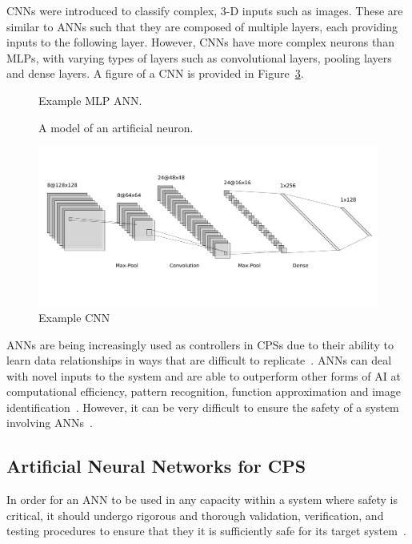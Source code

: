 \acp{CNN} were introduced to classify complex, 3-D inputs such as images.
These are similar to \acp{ANN} such that they are composed of multiple layers, each providing inputs to the following layer. 
However, \acp{CNN} have more complex neurons than \acp{MLP}, with varying types of layers such as convolutional layers, pooling layers and dense layers.
A figure of a \ac{CNN} is provided in Figure~\ref{fig:cnn}.


\begin{figure}
	\centering
	\scalebox{0.8}{}
	\caption{Example \ac{MLP} \ac{ANN}.	\label{fig:mlp-ann}}
\end{figure}
\begin{figure}
	\centering
	\scalebox{0.8}{}
	\caption{A model of an artificial neuron. \label{fig:artificial-neuron}}
\end{figure}
\begin{figure}
	\centering
	\includegraphics[width=\textwidth]{Content/fig/cnn-img.pdf}
	\caption{Example \ac{CNN} \label{fig:cnn}}
\end{figure}

\acp{ANN} are being increasingly used as controllers in \acp{CPS} due to their ability to learn data relationships in ways that are difficult to replicate~\cite{ANNSafety2007}. 
\acp{ANN} can deal with novel inputs to the system and are able to outperform other forms of \ac{AI} at computational efficiency, pattern recognition, function approximation and image identification~\cite{AIComp2016, AIComp2017}. 
However, it can be very difficult to ensure the safety of a system involving \acp{ANN}~\cite{ANNSafety2007, ANNSafety2018}.

\subsection{Artificial Neural Networks for \ac{CPS}}
In order for an \ac{ANN} to be used in any capacity within a system where safety is critical, it should undergo rigorous and thorough validation, verification, and testing procedures to ensure that they it is sufficiently safe for its target system~\cite{scann, ANNSafetyLifecycle2003}. 

